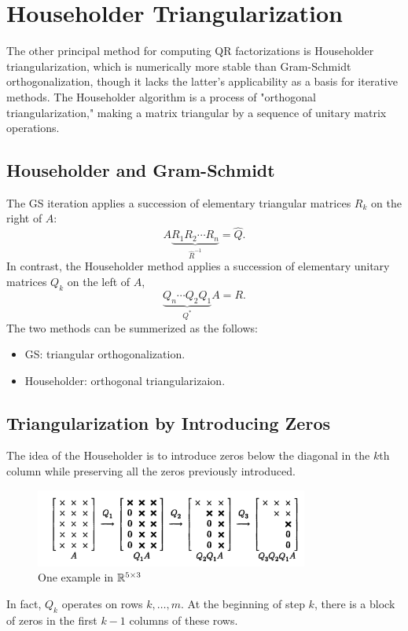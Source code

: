\chapter{Householder Triangularization}
The other principal method for computing QR factorizations is Householder triangularization, which is numerically more stable than Gram-Schmidt orthogonalization, though it lacks the latter's applicability as a basis for iterative methods. The Householder algorithm is a process of "orthogonal triangularization," making a matrix triangular by a sequence of unitary matrix operations.

\section{Householder and Gram-Schmidt} 
The GS iteration applies a succession of elementary triangular matrices $R_k$ on the right of $A$:
\[
    A \underbrace{R_1 R_2 \cdots R_n}_{\hat{R}^{-1}}=\hat{Q}.
\]
In contrast, the Householder method applies a succession of elementary unitary matrices $Q_k$ on the left of $A$, 
\[
    \underbrace{Q_n \cdots Q_2 Q_1}_{Q^*} A=R. 
\]
The two methods can be summerized as the follows: 
\begin{itemize}
    \item GS: triangular orthogonalization. 
    \item Householder: orthogonal triangularizaion. 
\end{itemize}

\section{Triangularization by Introducing Zeros} 
The idea of the Householder is to introduce zeros below the diagonal in the $k$th column while preserving all the zeros previously introduced. 
\begin{figure}[H]
    \centering
    \includegraphics[width=0.8\textwidth]{figures/10-1.png}
    \caption{One example in $\mathbb{R}^{5\times 3}$}
\end{figure}
In fact, $Q_k$ operates on rows $k,\ldots ,m$. At the beginning of step $k$, there is a block of zeros in the first $k-1$ columns of these rows. 

